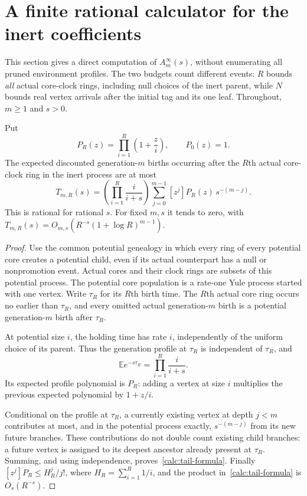 \section{A finite rational calculator for the inert coefficients}
\label{calc:section}

This section gives a direct computation of $A_m^\infty(s)$, without
enumerating all pruned environment profiles. The two budgets count
different events: $R$ bounds \emph{all} actual core-clock rings, including
null choices of the inert parent, while $N$ bounds real vertex arrivals
after the initial tag and its one leaf. Throughout, $m\ge1$ and $s>0$.

\begin{lemma}\label{calc:ring-tail}
Put
\[
 P_R(z)=\prod_{i=1}^R\left(1+\frac zi\right),
 \qquad P_0(z)=1.
\]
The expected discounted generation-$m$ births occurring after the $R$th
actual core-clock ring in the inert process are at most
\begin{equation}\label{calc:tail-formula}
 T_{m,R}(s)=
 \left(\prod_{i=1}^R\frac{i}{i+s}\right)
 \sum_{j=0}^{m-1}[z^j]P_R(z)\,s^{-(m-j)}.
\end{equation}
This is rational for rational $s$. For fixed $m,s$ it tends to zero,
with $T_{m,R}(s)=O_{m,s}(R^{-s}(1+\log R)^{m-1})$.
\end{lemma}

\begin{proof}
Use the common potential genealogy in which every ring of every
potential core creates a potential child, even if its actual counterpart
has a null or nonpromotion event. Actual cores and their clock rings
are subsets of this potential process. The potential core population
is a rate-one Yule process started with one vertex. Write $\tau_R$ for
its $R$th birth time. The $R$th actual core ring occurs no earlier than
$\tau_R$, and every omitted actual generation-$m$ birth is a potential
generation-$m$ birth after $\tau_R$.

At potential size $i$, the holding time has rate $i$, independently of
the uniform choice of its parent. Thus the generation profile at
$\tau_R$ is independent of $\tau_R$, and
\[
 \mathbb E e^{-s\tau_R}=\prod_{i=1}^R\frac{i}{i+s}.
\]
Its expected profile polynomial is $P_R$: adding a vertex at size $i$
multiplies the previous expected polynomial by $1+z/i$.

Conditional on the profile at $\tau_R$, a currently existing vertex
at depth $j<m$ contributes at most, and in the potential process exactly,
$s^{-(m-j)}$ from its new future branches. These contributions do not
double count existing child branches: a future vertex is assigned to
its deepest ancestor already present at $\tau_R$. Summing, and using
independence, proves~\eqref{calc:tail-formula}.
Finally $[z^j]P_R\le H_R^j/j!$, where $H_R=\sum_{i=1}^R1/i$, and the
product in~\eqref{calc:tail-formula} is $O_s(R^{-s})$.
\end{proof}

